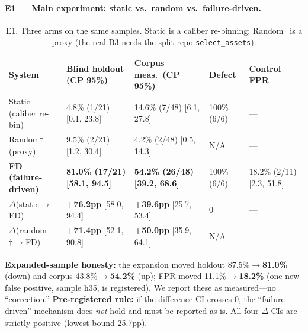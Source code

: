 \documentclass{article}
\begin{document}
\paragraph{E1 --- Main experiment: static vs.\ random vs.\ failure-driven.}
\begin{table}[t]
\caption{E1. Three arms on the same samples. Static is a caliber re-binning; Random$\dagger$ is a
proxy (the real B3 needs the split-repo \texttt{select\_assets}).}
\label{tab:e1}
\centering
\small
\begin{tabular}{@{}lp{2.7cm}p{2.4cm}p{1.7cm}p{1.5cm}@{}}
\toprule
System & Blind holdout (CP 95\%) & Corpus meas.\ (CP 95\%) & Defect & Control FPR \\
\midrule
Static (caliber re-bin) & 4.8\% (1/21) [0.1, 23.8] & 14.6\% (7/48) [6.1, 27.8] & 100\% (6/6) & --- \\
Random$\dagger$ (proxy) & 9.5\% (2/21) [1.2, 30.4] & 4.2\% (2/48) [0.5, 14.3] & N/A & --- \\
\textbf{FD (failure-driven)} & \textbf{81.0\% (17/21) [58.1, 94.5]} & \textbf{54.2\% (26/48) [39.2, 68.6]} & 100\% (6/6) & 18.2\% (2/11) [2.3, 51.8] \\
$\Delta$(static$\to$FD) & \textbf{+76.2pp} [58.0, 94.4] & \textbf{+39.6pp} [25.7, 53.4] & 0 & --- \\
$\Delta$(random$\dagger\to$FD) & \textbf{+71.4pp} [52.1, 90.8] & \textbf{+50.0pp} [35.9, 64.1] & N/A & --- \\
\bottomrule
\end{tabular}
\end{table}
\textbf{Expanded-sample honesty:} the expansion moved holdout 87.5\%$\to$\textbf{81.0\%} (down)
and corpus 43.8\%$\to$\textbf{54.2\%} (up); FPR moved 11.1\%$\to$\textbf{18.2\%} (one new false
positive, sample h35, is registered). We report these as measured---no ``correction.''
\textbf{Pre-registered rule:} if the difference CI crosses 0, the ``failure-driven'' mechanism
does \emph{not} hold and must be reported as-is. All four $\Delta$ CIs are strictly positive
(lowest bound 25.7pp).
\end{document}
